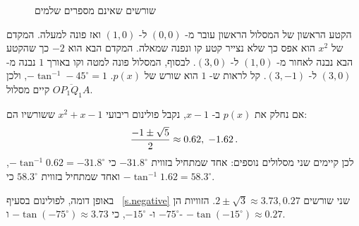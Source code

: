 \begin{figure}[htb]
\begin{center}
\end{center}
\caption{שורשים שאינם מספרים שלמים}\label{f.lill6}
\end{figure}


הקטע הראשון של המסלול הראשון עובר מ-%
$(0,0)$
ל-%
$(1,0)$
ואז פונה למעלה. המקדם של
$x^2$
הוא אפס כך שלא נצייר קטע קו ונפנה שמאלה. המקדם הבא הוא
$-2$
כך שהקטע הבא נבנה לאחור מ-%
$(1,0)$
ל-%
$(3,0)$.
לבסוף, המסלול פונה למטה וקו באורך 
$1$
נבנה מ-%
$(3,0)$
ל-%
$(3,-1)$.
קל לראות ש-%
$1$
הוא שורש של
$p(x)$.
$-\tan^{-1} -45^\circ=1$,
ולכן קיים מסלול
$\overline{OP_1Q_1A}$.

אם נחלק את
$p(x)$
ב-%
$x-1$,
נקבל פולינום ריבועי
$x^2+x-1$
ששורשיו הם:
\[
\displaystyle\frac{-1\pm\sqrt{5}}{2} \approx 0.62,\; -1.62\,.
\]
לכן קיימים שני מסלולים נוספים: אחד שמתחיל בזווית
$-31.8^\circ$
כי
$-\tan^{-1} 0.62=-31.8^\circ$,
ואחד שמתחיל בזווית
$58.3^\circ$
כי
$-\tan^{-1}1.62=58.3^\circ$.

באופן דומה, לפולינום בסעיף%
~\ref{s.negative}
שני שורשים
$ 2\pm\sqrt{3}\approx 3.73, 0.27$.
הזוויות הן
$-75^\circ$
ו-%
$-15^\circ$,
כי
$-\tan (-75^\circ)\approx 3.73$ 
ו-%
$-\tan (-15^\circ)\approx 0.27$.

